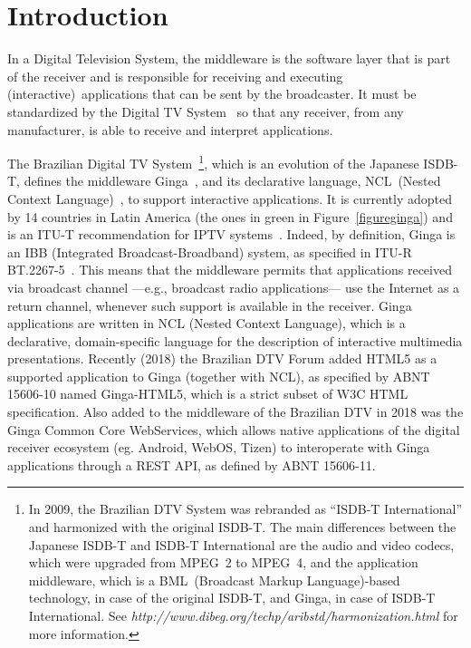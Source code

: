 \documentclass[11pt]{article}
\begin{document}
\newpage
\renewcommand{\contentsname}{Table of Contents }
\renewcommand{\appendixname}{Annex}
\tableofcontents

\newpage
{} \setcounter{page}{1}

\section{Introduction}
In a Digital Television System, the middleware is the software layer that is
part of the receiver and is responsible for receiving and executing
(interactive)~applications that can be sent by the broadcaster. It must be
standardized by the Digital TV System~\cite{morris_interactive_2005} so
that any receiver, from any manufacturer, is able to receive and interpret
applications.

The Brazilian Digital TV System\null~\footnote{In 2009, the Brazilian DTV System was rebranded as
``ISDB-T International'' and harmonized with the original ISDB-T. The main
differences between the Japanese ISDB-T and ISDB-T International are the
audio and video codecs, which were upgraded from MPEG~2 to MPEG~4, and the
application middleware, which is a BML~(Broadcast Markup Language)-based
technology, in case of the original ISDB-T, and Ginga, in case of ISDB-T
International. See
\emph{http://www.dibeg.org/techp/aribstd/harmonization.html} for more
information.
},
%
which is an evolution of the
Japanese ISDB-T, defines the middleware Ginga~\cite{Soares-L-F-G-2010b},
and its declarative language, NCL~(Nested Context
Language)~\cite{ABNT-15606-2-2015}, to support interactive applications.
It is currently adopted by 14 countries in Latin America (the ones in green
in Figure~\ref{figureginga}) and is an ITU-T recommendation for IPTV
systems~\cite{ITU-T-H761-2014}.
Indeed, by definition, Ginga is an IBB (Integrated Broadcast-Broadband) system,
as specified in ITU-R BT.2267-5~\cite{ITU-2267-5-2015}.
This means that the middleware permits that applications received via broadcast
channel ---e.g., broadcast radio applications--- use the Internet as a
return channel, whenever such support is available in the receiver.
Ginga applications are written in NCL (Nested Context Language), which is a
declarative, domain-specific language for the description of interactive
multimedia presentations. Recently (2018) the Brazilian DTV Forum
added HTML5 as a supported application to Ginga (together with
NCL), as specified by ABNT 15606-10\cite{ABNT-15606-10-2018} named
Ginga-HTML5, which is a strict subset of W3C HTML specification. Also
added to the middleware of the Brazilian DTV in 2018 was the Ginga Common
Core WebServices, which allows native applications of the digital receiver
ecosystem (eg. Android, WebOS, Tizen) to interoperate with Ginga
applications through a REST API, as defined by ABNT
15606-11\cite{ABNT-15606-11-2018}.
\end{document}

